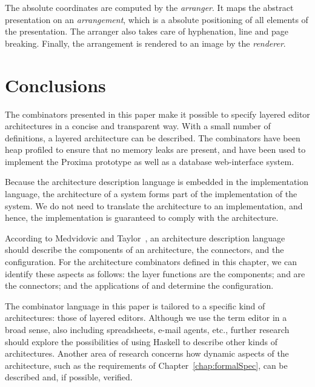 \documentclass[preprint,natbib]{sigplanconf}
\begin{document}
The absolute coordinates are computed by the {\em arranger}. It maps the abstract presentation on an {\em arrangement}, which is a absolute positioning of all elements of the presentation. The arranger also takes care of hyphenation, line and page breaking. Finally, the arrangement is rendered to an image by the {\em renderer}.
\ec


%																
%																
%																
\section{Conclusions} \label{sect:haskellconclusions}

The combinators presented in this paper make it possible to specify layered editor architectures in a concise and transparent way. With a small number of definitions, a layered architecture can be described. The combinators have been heap profiled to ensure that no memory leaks are present, and have been used to implement the Proxima prototype as well as a database web-interface system.

Because the architecture description language is embedded in the implementation language, the architecture of a system forms part of the implementation of the system. We do not need to translate the architecture to an implementation, and hence, the implementation is guaranteed to comply with the architecture.

According to Medvidovic and Taylor~\cite{medvidovic00ADLs}, an architecture description language should describe the components of an architecture, the connectors, and the configuration. For the architecture combinators defined in this chapter, we can identify these aspects as follows: the layer functions are the components;  and  are the connectors; and the applications of  and  determine the configuration.

The combinator language in this paper is tailored to a specific kind of architectures: those of layered editors. Although we use the term editor in a broad sense, also including spreadsheets, e-mail agents, etc., further research should explore the possibilities of using Haskell to describe other kinds of architectures. Another area of research concerns how dynamic aspects of the architecture, such as the requirements of Chapter~\ref{chap:formalSpec}, can be described and, if possible, verified.









\end{document}
